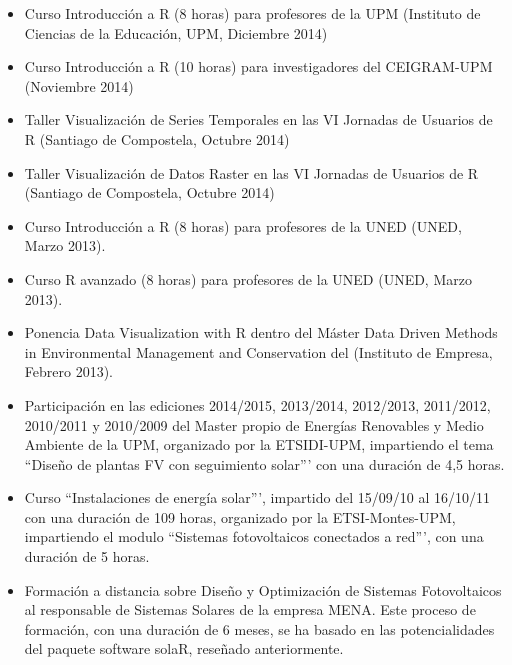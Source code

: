 \documentclass[article, a4paper]{memoir}
\begin{document}
\begin{itemize}
\item Curso \guillemotleft{}Introducción a R\guillemotright{} (8 horas) para profesores de la UPM (Instituto de Ciencias de la Educación, UPM, Diciembre 2014)

\item Curso \guillemotleft{}Introducción a R\guillemotright{} (10 horas) para investigadores del CEIGRAM-UPM (Noviembre 2014)

\item Taller \guillemotleft{}Visualización de Series Temporales\guillemotright{} en las VI Jornadas de Usuarios de R (Santiago de Compostela, Octubre 2014)

\item Taller \guillemotleft{}Visualización de Datos Raster\guillemotright{} en las VI Jornadas de Usuarios de R (Santiago de Compostela, Octubre 2014)

\item Curso \guillemotleft{}Introducción a R\guillemotright{} (8 horas) para profesores de la UNED (UNED, Marzo 2013).

\item Curso \guillemotleft{}R avanzado\guillemotright{} (8 horas) para profesores de la UNED (UNED, Marzo 2013).

\item Ponencia \guillemotleft{}Data Visualization with R\guillemotright{} dentro del Máster \guillemotleft{}Data Driven Methods in Environmental Management and Conservation\guillemotright{} del (Instituto de Empresa, Febrero 2013).

\item Participación en las ediciones 2014/2015, 2013/2014, 2012/2013, 2011/2012, 2010/2011 y 2010/2009 del Master propio de Energías Renovables y Medio Ambiente de la UPM, organizado por la ETSIDI-UPM, impartiendo el tema ``Diseño de plantas FV con seguimiento solar''' con una duración de 4,5 horas.

\item Curso ``Instalaciones de energía solar''', impartido del 15/09/10 al 16/10/11 con una duración de 109 horas, organizado por la ETSI-Montes-UPM, impartiendo el modulo ``Sistemas fotovoltaicos conectados a red''', con una duración de 5 horas.

\item Formación a distancia sobre Diseño y Optimización de Sistemas Fotovoltaicos al responsable de Sistemas Solares de la empresa MENA. Este proceso de formación, con una duración de 6 meses, se ha basado en las potencialidades del paquete software solaR, reseñado anteriormente.


\end{itemize}
\end{document}
